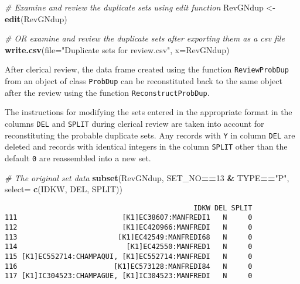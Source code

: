 \documentclass[]{article}
\newenvironment{Shaded}{\begin{snugshade}}{\end{snugshade}}
\newcommand{\CommentTok}[1]{\textcolor[rgb]{0.56,0.35,0.01}{\textit{#1}}}
\newcommand{\DataTypeTok}[1]{\textcolor[rgb]{0.13,0.29,0.53}{#1}}
\newcommand{\DecValTok}[1]{\textcolor[rgb]{0.00,0.00,0.81}{#1}}
\newcommand{\KeywordTok}[1]{\textcolor[rgb]{0.13,0.29,0.53}{\textbf{#1}}}
\newcommand{\NormalTok}[1]{#1}
\newcommand{\OperatorTok}[1]{\textcolor[rgb]{0.81,0.36,0.00}{\textbf{#1}}}
\newcommand{\StringTok}[1]{\textcolor[rgb]{0.31,0.60,0.02}{#1}}
\begin{document}
\begin{Shaded}
\begin{Highlighting}[]
\CommentTok{# Examine and review the duplicate sets using edit function}
\NormalTok{RevGNdup <-}\StringTok{ }\KeywordTok{edit}\NormalTok{(RevGNdup)}

\CommentTok{# OR examine and review the duplicate sets after exporting them as a csv file}
\KeywordTok{write.csv}\NormalTok{(}\DataTypeTok{file=}\StringTok{"Duplicate sets for review.csv"}\NormalTok{, }\DataTypeTok{x=}\NormalTok{RevGNdup)}
\end{Highlighting}
\end{Shaded}

After clerical review, the data frame created using the function
\texttt{ReviewProbDup} from an object of class \texttt{ProbDup} can be
reconstituted back to the same object after the review using the
function \texttt{ReconstructProbDup}.

The instructions for modifying the sets entered in the appropriate
format in the columns \texttt{DEL} and \texttt{SPLIT} during clerical
review are taken into account for reconstituting the probable duplicate
sets. Any records with \texttt{Y} in column \texttt{DEL} are deleted and
records with identical integers in the column \texttt{SPLIT} other than
the default \texttt{0} are reassembled into a new set.

\begin{Shaded}
\begin{Highlighting}[]
\CommentTok{# The original set data}
\KeywordTok{subset}\NormalTok{(RevGNdup, SET_NO}\OperatorTok{==}\DecValTok{13} \OperatorTok{&}\StringTok{ }\NormalTok{TYPE}\OperatorTok{==}\StringTok{"P"}\NormalTok{, }\DataTypeTok{select=} \KeywordTok{c}\NormalTok{(IDKW, DEL, SPLIT))}
\end{Highlighting}
\end{Shaded}

\begin{verbatim}
                                             IDKW DEL SPLIT
111                         [K1]EC38607:MANFREDI1   N     0
112                         [K1]EC420966:MANFREDI   N     0
113                        [K1]EC42549:MANFREDI68   N     0
114                          [K1]EC42550:MANFRED1   N     0
115 [K1]EC552714:CHAMPAQUI, [K1]EC552714:MANFREDI   N     0
116                       [K1]EC573128:MANFREDI84   N     0
117 [K1]IC304523:CHAMPAGUE, [K1]IC304523:MANFREDI   N     0
\end{verbatim}
\end{document}
